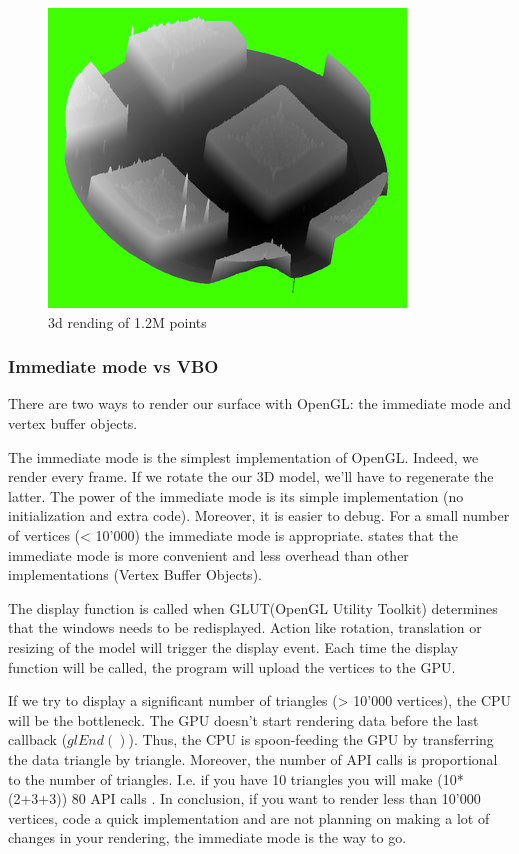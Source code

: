\begin{figure}[H]
  \centering
  \includegraphics[scale=0.8]{images/3drendering.png}
    \caption{3d rending of 1.2M points}
  \label{rendering3d}
\end{figure}

\subsubsection{Immediate mode vs VBO}

There are two ways to render our surface with OpenGL: the immediate mode and vertex buffer objects.

The immediate mode is the simplest implementation of OpenGL. Indeed, we render every frame. If we rotate the our 3D model, we'll have to regenerate the latter. The power of the immediate mode is its simple implementation (no initialization and extra code). Moreover, it is easier to debug. For a small number of vertices (< 10'000) the immediate mode is appropriate. \cite{opengl1} states that the immediate mode is more convenient and less overhead than other implementations (Vertex Buffer Objects).

The display function is called when GLUT(OpenGL Utility Toolkit) determines that the windows needs to be redisplayed. Action like rotation, translation or resizing of the model will trigger the display event. Each time the display function will be called, the program will upload the vertices to the GPU.

If we try to display a significant number of triangles (> 10'000 vertices), the CPU will be the bottleneck. The GPU doesn't start rendering data before the last callback ($glEnd()$). Thus, the CPU is spoon-feeding the GPU by transferring the data triangle by triangle. Moreover, the number of API calls is proportional to the number of triangles. I.e. if you have 10 triangles you will make (10*(2+3+3)) 80 API calls \cite{opengllegacy}. In conclusion, if you want to render less than 10'000 vertices, code a quick implementation and are not planning on making a lot of changes in your rendering, the immediate mode is the way to go.

